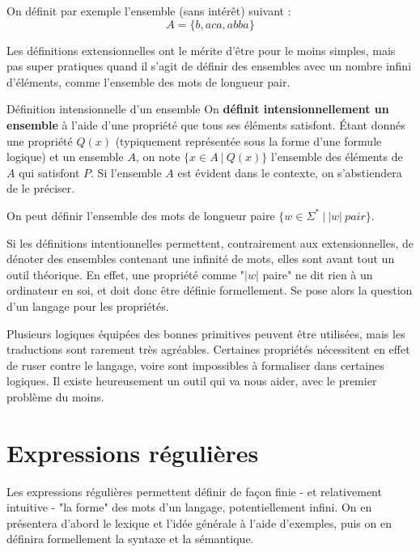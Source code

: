 \begin{example} On définit par exemple l'ensemble (sans intérêt) suivant :
\[
    A = \{b, aca, abba\}
\]
\end{example}

Les définitions extensionnelles ont le mérite d'être pour le moins simples, mais pas super pratiques quand il s'agit de définir des ensembles avec un nombre infini d'éléments, comme l'ensemble des mots de longueur pair. 

\begin{definition}{Définition intensionnelle d'un ensemble}{}
On \textbf{définit intensionnellement un ensemble} à l'aide d'une propriété que tous ses éléments satisfont. Étant donnés une propriété $Q(x)$ (typiquement représentée sous la forme d'une formule logique) et un ensemble $A$, on note $\{x \in A~|~Q(x)\}$ l'ensemble des éléments de $A$ qui satisfont $P$. Si l'ensemble $A$ est évident dans le contexte, on s'abstiendera de le préciser.
\end{definition}

\begin{example}
On peut définir l'ensemble des mots de longueur paire $\{w \in \Sigma^*~|~|w|~pair\}$.
\end{example}

Si les définitions intentionnelles permettent, contrairement aux extensionnelles, de dénoter des ensembles contenant une infinité de mots, elles sont avant tout un outil théorique. En effet, une propriété comme "$|w|$ paire" ne dit rien à un ordinateur en soi, et doit donc être définie formellement. Se pose alors la question d'un langage pour les propriétés.

Plusieurs logiques équipées des bonnes primitives peuvent être utilisées, mais les traductions sont rarement très agréables. Certaines propriétés nécessitent en effet de ruser contre le langage, voire sont impossibles à formaliser dans certaines logiques. Il existe heureusement un outil qui va nous aider, avec le premier problème du moins.

\chapter{Expressions régulières}
\label{regex}
Les expressions régulières permettent définir de façon finie - et relativement intuitive - "la forme" des mots d'un langage, potentiellement infini. On en présentera d'abord le lexique et l'idée générale à l'aide d'exemples, puis on en définira formellement la syntaxe et la sémantique.
